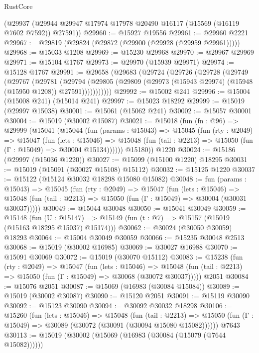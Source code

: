 \begin{lexlean}{RustCore}
\begin{coremodule}
    (@29937 (@29944 @29947 @17974 @17978 @20490 @16117 (@15569 (@16119 @7602 @7592)) @27591))
@29960 := @15927 @19556
@29961 := @29960 @2221
@29967 := @29819 (@29824 (@29872 (@29900 (@29928 (@29959 @29961)))))
@29968 := @15033 @1208
@29969 := @15230 @29968
@29970 := @29967 @29969
@29971 := @15104 @1767
@29973 := @29970 (@15939 @29971)
@29974 := @15128 @1767
@29991 := @29658
    (@29683
      (@29724
        (@29726
          (@29728
            (@29749
              (@29767
                (@29781
                  (@29794
                    (@29805
                      (@29809 (@29973 (@15943 @29974) (@15948 (@15950 @1208)) @27591)))))))))))
@29992 := @15002 @241
@29996 := @15004 (@15008 @241) (@15014 @241)
@29997 := @15023 @18292
@29999 := @15019 (@29997 @15038)
@30001 := @15061 (@15062 @241)
@30002 := @15057 @30001
@30004 := @15019 (@30002 @15087)
@30021 := @15018
    (fun (fn : @96) =>
    @29999
      (@15041
        (@15044
          (fun (params : @15043) =>
          @15045
            (fun (rty : @2049) =>
            @15047
              (fun (lets : @15046) =>
              @15048 (fun (tail : @2213) => @15050 (fun (Γ : @15049) => @30004 @15134))))))
        @15180))
    @1220
@30024 := @15186 (@29997 (@15036 @1220))
@30027 := @15099 (@15100 @1220) @18295
@30031 := @15019 (@15091 (@30027 @15108) @15112)
@30032 := @15125 @1220
@30037 := @15122 (@15124 @30032 @18298 @15080 @15082)
@30048 := fun (params : @15043) =>
  @15045
    (fun (rty : @2049) =>
    @15047
      (fun (lets : @15046) =>
      @15048 (fun (tail : @2213) => @15050 (fun (Γ : @15049) => @30004 (@30031 @30037)))))
@30049 := @15044 @30048
@30050 := @15041 @30049
@30059 := @15148
    (fun (U : @15147) => @15149 (fun (t : @7) => @15157 (@15019 (@15163 @18295 @15037) @15174)))
@30062 := @30024 (@30050 @30059) @18293
@30064 := @15004 @30049 @30059
@30066 := @15235 @30048 @2513
@30068 := @15019 (@30002 @16985)
@30069 := @30027 @16988
@30070 := @15091 @30069
@30072 := @15019 (@30070 @15112)
@30083 := @15238
    (fun (rty : @2049) =>
    @15047
      (fun (lets : @15046) =>
      @15048 (fun (tail : @2213) => @15050 (fun (Γ : @15049) => @30068 (@30072 @30037)))))
    @2051
@30084 := @15076 @2051
@30087 := @15069 (@16983 (@30084 @15084))
@30089 := @15019 (@30002 @30087)
@30090 := @15120 @2051
@30091 := @15119 @30090
@30092 := @15123 @30090
@30094 := @30092 @30032 @18298
@30106 := @15260
    (fun (lets : @15046) =>
    @15048
      (fun (tail : @2213) =>
      @15050 (fun (Γ : @15049) => @30089 (@30072 (@30091 (@30094 @15080 @15082))))))
    @7643
@30113 := @15019 (@30002 (@15069 (@16983 (@30084 (@15079 (@7644 @15082))))))

\end{coremodule}
\end{lexlean}
